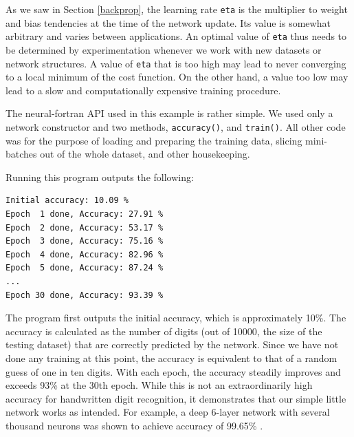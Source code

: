 \documentclass[sigplan, review=false, screen=true, balance=true]{acmart}
\begin{document}
As we saw in Section \ref{backprop}, the learning rate \lstinline{eta} is the
multiplier to weight and bias tendencies at the time of the network update.
Its value is somewhat arbitrary and varies between applications. An optimal
value of \lstinline{eta} thus needs to be determined by experimentation whenever
we work with new datasets or network structures. A value of \lstinline{eta}
that is too high may lead to never converging to a local minimum of the cost
function. On the other hand, a value too low may lead to a slow and
computationally expensive training procedure.

The neural-fortran API used in this example is rather simple. We used only
a network constructor and two methods, \lstinline{accuracy()}, and
\lstinline{train()}. All other code was for the purpose of loading and
preparing the training data, slicing mini-batches out of the whole dataset,
and other housekeeping.

Running this program outputs the following:

\begin{minipage}{\linewidth}
\begin{lstlisting}[caption={Output from the MNIST training example program. Some lines omitted for brevity.}, captionpos=b]
Initial accuracy: 10.09 %
Epoch  1 done, Accuracy: 27.91 %
Epoch  2 done, Accuracy: 53.17 %
Epoch  3 done, Accuracy: 75.16 %
Epoch  4 done, Accuracy: 82.96 %
Epoch  5 done, Accuracy: 87.24 %
...
Epoch 30 done, Accuracy: 93.39 %
\end{lstlisting}
\end{minipage}

The program first outputs the initial accuracy, which is approximately 10\%.
The accuracy is calculated as the number of digits (out of 10000, the size
of the testing dataset) that are correctly predicted by the network.
Since we have not done any training at this point, the accuracy is equivalent
to that of a random guess of one in ten digits. With each epoch, the accuracy
steadily improves and exceeds 93\% at the 30th epoch. While this is not an
extraordinarily high accuracy for handwritten digit recognition, it demonstrates
that our simple little network works as intended. For example, a deep 6-layer
network with several thousand neurons was shown to achieve accuracy of
99.65\% \citep{ciresan10}.
\end{document}
